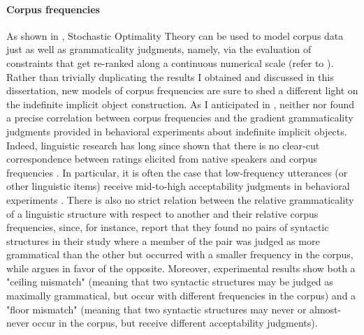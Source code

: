
\paragraph{Corpus frequencies}

As shown in \textcite{Boersma2004, BoersmaHayes2001empirical}, Stochastic Optimality Theory can be used to model corpus data just as well as grammaticality judgments, namely, via the evaluation of constraints that get re-ranked along a continuous numerical scale (refer to ). Rather than trivially duplicating the results I obtained and discussed in this dissertation, new models of corpus frequencies are sure to shed a different light on the indefinite implicit object construction. As I anticipated in , neither \textcite{Resnik1993, Resnik1996} nor \textcite{Medina2007} found a precise correlation between corpus frequencies and the gradient grammaticality judgments provided in behavioral experiments about indefinite implicit objects.\\
Indeed, linguistic research has long since shown that there is no clear-cut correspondence between ratings elicited from native speakers and corpus frequencies \parencite{manning2003probabilistic}. In particular, it is often the case that low-frequency utterances (or other linguistic items) receive mid-to-high acceptability judgments in behavioral experiments \parencite{KempenHarbusch2005, BermelKnittl2012, BaderHaussler2010, Boersma2004, KellerAsudeh2002}. There is also no strict relation between the relative grammaticality of a linguistic structure with respect to another and their relative corpus frequencies, since, for instance, \textcite[315-316]{BaderHaussler2010} report that they found no pairs of syntactic structures in their study where a member of the pair was judged as more grammatical than the other but occurred with a smaller frequency in the corpus, while \textcite{Boersma2004} argues in favor of the opposite. Moreover, \textcite{BaderHaussler2010} experimental results show both a "ceiling mismatch" (meaning that two syntactic structures may be judged as maximally grammatical, but occur with different frequencies in the corpus) and a "floor mismatch" (meaning that two syntactic structures may never or almost-never occur in the corpus, but receive different acceptability judgments).\\
